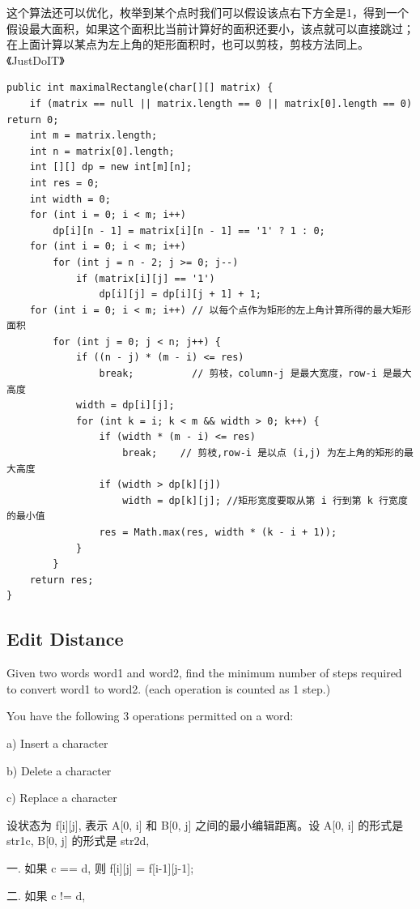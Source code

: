 \documentclass[12pt]{book}
\begin{document}
\begin{enumerate}
这个算法还可以优化，枚举到某个点时我们可以假设该点右下方全是1，得到一个假设最大面积，如果这个面积比当前计算好的面积还要小，该点就可以直接跳过；在上面计算以某点为左上角的矩形面积时，也可以剪枝，剪枝方法同上。《JustDoIT》
\lstset{language=java,label= ,caption= ,numbers=none}
\begin{lstlisting}
public int maximalRectangle(char[][] matrix) {
    if (matrix == null || matrix.length == 0 || matrix[0].length == 0) return 0;
    int m = matrix.length;
    int n = matrix[0].length;
    int [][] dp = new int[m][n];
    int res = 0;
    int width = 0;
    for (int i = 0; i < m; i++) 
        dp[i][n - 1] = matrix[i][n - 1] == '1' ? 1 : 0;
    for (int i = 0; i < m; i++) 
        for (int j = n - 2; j >= 0; j--) 
            if (matrix[i][j] == '1')
                dp[i][j] = dp[i][j + 1] + 1;
    for (int i = 0; i < m; i++) // 以每个点作为矩形的左上角计算所得的最大矩形面积
        for (int j = 0; j < n; j++) {
            if ((n - j) * (m - i) <= res)
                break;          // 剪枝，column-j 是最大宽度，row-i 是最大高度
            width = dp[i][j];
            for (int k = i; k < m && width > 0; k++) {
                if (width * (m - i) <= res)
                    break;    // 剪枝,row-i 是以点 (i,j) 为左上角的矩形的最大高度
                if (width > dp[k][j])
                    width = dp[k][j]; //矩形宽度要取从第 i 行到第 k 行宽度的最小值
                res = Math.max(res, width * (k - i + 1));
            }
        }
    return res;
}
\end{lstlisting}
\end{enumerate}

\subsection{Edit Distance}
\label{sec-14-3-4}
Given two words word1 and word2, find the minimum number of steps required to convert word1 to word2. (each operation is counted as 1 step.)

You have the following 3 operations permitted on a word:

a) Insert a character

b) Delete a character

c) Replace a character

设状态为 f[i][j], 表示 A[0, i] 和 B[0, j] 之间的最小编辑距离。设 A[0, i] 的形式是 str1c, B[0, j] 的形式是 str2d, 

一. 如果 c == d, 则 f[i][j] = f[i-1][j-1];

二. 如果 c != d,
\end{document}
